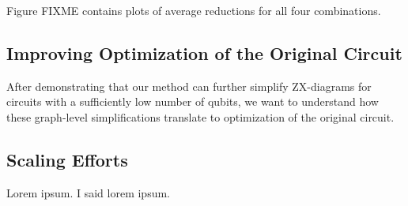 Figure FIXME contains plots of average reductions for all four combinations.


\subsection*{Improving Optimization of the Original Circuit}

After demonstrating that our method can further simplify ZX-diagrams for circuits with a sufficiently low number of qubits, we want to understand how these graph-level simplifications translate to optimization of the original circuit.



\subsection*{Scaling Efforts}


Lorem ipsum. I said lorem ipsum.


